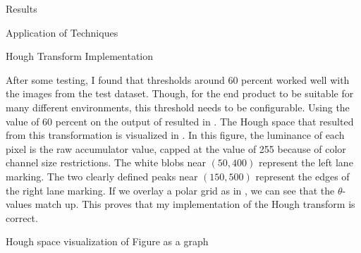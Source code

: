 \documentclass{matthijs}
\begin{document}
\begin{hoofdstuk}{Results}
\begin{paragraaf}{Application of Techniques}
\begin{subparagraaf}{Hough Transform Implementation}
				\bigskip

				After some testing, I found that thresholds around 60 percent worked well with the images from the test dataset.
				Though, for the end product to be suitable for many different environments, this threshold needs to be configurable.
				Using the value of 60 percent on the output of  resulted in .
				The Hough space that resulted from this transformation is visualized in .
				In this figure, the luminance of each pixel is the raw accumulator value, capped at the value of 255 because of color channel size restrictions.
				The white blobs near $(50,400)$ represent the left lane marking.
				The two clearly defined peaks near $(150,500)$ represent the edges of the right lane marking.
				If we overlay a polar grid as in , we can see that the $\theta$-values match up.
				This proves that my implementation of the Hough transform is correct.

				\begin{figuur}{Hough space visualization of Figure  as a graph}

\end{figuur}
\end{subparagraaf}
\end{paragraaf}
\end{hoofdstuk}
\end{document}
